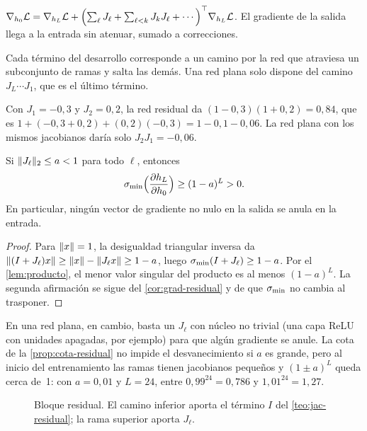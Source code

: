 \begin{corolario}\label{cor:grad-residual}
$\nabla_{h_0}\mathcal{L}=\nabla_{h_L}\mathcal{L}+\Bigl(\sum_{\ell}J_\ell+\sum_{\ell<k}J_kJ_\ell+\cdots\Bigr)^{\top}\nabla_{h_L}\mathcal{L}$. El gradiente de la salida llega a la entrada sin atenuar, sumado a correcciones.
\end{corolario}

Cada término del desarrollo corresponde a un camino por la red que atraviesa un subconjunto de ramas y salta las demás. Una red plana solo dispone del camino $J_L\cdots J_1$, que es el último término.

\begin{ejemplo}\label{ej:dos-bloques}
Con $J_1=-0{,}3$ y $J_2=0{,}2$, la red residual da $(1-0{,}3)(1+0{,}2)=0{,}84$, que es $1+(-0{,}3+0{,}2)+(0{,}2)(-0{,}3)=1-0{,}1-0{,}06$. La red plana con los mismos jacobianos daría solo $J_2J_1=-0{,}06$.
\end{ejemplo}

\begin{proposicion}\label{prop:cota-residual}
Si $\lVert J_\ell\rVert_2\le a<1$ para todo $\ell$, entonces
\[
\sigma_{\min}\Bigl(\frac{\partial h_L}{\partial h_0}\Bigr)\ge(1-a)^{L}>0 .
\]
En particular, ningún vector de gradiente no nulo en la salida se anula en la entrada.
\end{proposicion}

\begin{proof}
Para $\lVert x\rVert=1$, la desigualdad triangular inversa da $\lVert(I+J_\ell)x\rVert\ge\lVert x\rVert-\lVert J_\ell x\rVert\ge 1-a$, luego $\sigma_{\min}(I+J_\ell)\ge 1-a$. Por el \cref{lem:producto}, el menor valor singular del producto es al menos $(1-a)^{L}$. La segunda afirmación se sigue del \cref{cor:grad-residual} y de que $\sigma_{\min}$ no cambia al trasponer.
\end{proof}

En una red plana, en cambio, basta un $J_\ell$ con núcleo no trivial (una capa ReLU con unidades apagadas, por ejemplo) para que algún gradiente se anule. La cota de la \cref{prop:cota-residual} no impide el desvanecimiento si $a$ es grande, pero al inicio del entrenamiento las ramas tienen jacobianos pequeños y $(1\pm a)^{L}$ queda cerca de~1: con $a=0{,}01$ y $L=24$, entre $0{,}99^{24}=0{,}786$ y $1{,}01^{24}=1{,}27$.

\begin{figure}[h]
\centering
{}
\caption{Bloque residual. El camino inferior aporta el término $I$ del \cref{teo:jac-residual}; la rama superior aporta $J_\ell$.}
\label{fig:bloque-residual}
\end{figure}

